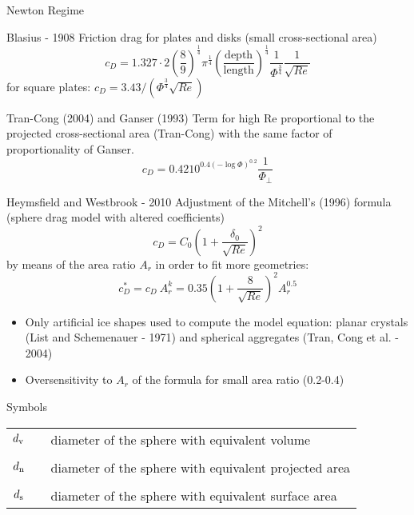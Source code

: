 \documentclass[11pt]{beamer}
\begin{document}
	\begin{frame}{Newton Regime}
		\begin{block}{Blasius - 1908}
			Friction drag for plates and disks (small cross-sectional area)
			\begin{equation*}
				c_D = 1.327 \cdot 2 \left(\frac{8}{9}\right)^{\frac{1}{4}} \pi^{\frac{1}{4}} \left(\frac{\text{depth}}{\text{length}}\right)^{\frac{1}{4}} \frac{1}{\Phi^{\frac{3}{4}}} \frac{1}{\sqrt{Re}}
			\end{equation*}
			for square plates: \quad $ c_D = 3.43 / (\Phi^{\frac{3}{4}} \sqrt{Re}) $
		\end{block}
	
		\begin{block}{Tran-Cong (2004) and Ganser (1993)}
			Term for high Re proportional to the projected cross-sectional area (Tran-Cong) with the same factor of proportionality of Ganser.
			\begin{equation*}
				c_D = 0.4210^{0.4(-\log \Phi)^{0.2}} \frac{1}{\Phi_{\perp}}
			\end{equation*}
		\end{block}
	\end{frame}

	\begin{frame}{Heymsfield and Westbrook - 2010}
		Adjustment of the Mitchell's (1996) formula (sphere drag model with altered coefficients)
		\begin{equation*}
			c_D = C_0 \left( 1 + \frac{\delta_0}{\sqrt{Re}} \right)^2
		\end{equation*}
		by means of the area ratio $ A_r $ in order to fit more geometries:
		\begin{equation*}
			c_D^* = c_D \ A_r^k = 0.35 \left( 1 + \frac{8}{\sqrt{Re}} \right)^2 A_r^{0.5}
		\end{equation*}
		\begin{itemize}
			\item Only artificial ice shapes used to compute the model equation: planar crystals (List and Schemenauer - 1971) and spherical aggregates (Tran, Cong et al. - 2004)
			\item Oversensitivity to $ A_r $ of the formula for small area ratio (0.2-0.4)
		\end{itemize}
	\end{frame}
	
	\begin{frame}{Symbols}
		\begin{tabular}{ccl}
			$ d_{\textup{v}} $ & & diameter of the sphere with equivalent volume \\
			\\
			$ d_{\textup{n}} $ & & diameter of the sphere with equivalent projected area\\
			\\
			$ d_{\textup{s}} $ & & diameter of the sphere with equivalent surface area
		\end{tabular}
	\end{frame}
\end{document}
